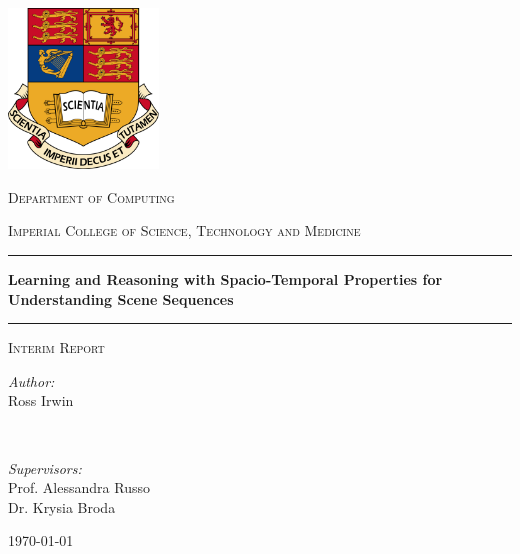 \begin{titlepage}

\newcommand{\HRule}{\rule{\linewidth}{0.5mm}} %

\begin{center}

\includegraphics[width = 4cm]{figures/imperial-crest}
\vspace{0.8cm}

\textsc{\large Department of Computing}
\vspace{0.3cm}

\textsc{\large Imperial College of Science, Technology and Medicine}
\vspace{0.8cm}

\HRule
\vspace{0.4cm}
\huge \textbf{Learning and Reasoning with Spacio-Temporal Properties for Understanding Scene Sequences} \\
\HRule
\vspace{0.5cm}

\textsc{\LARGE Interim Report}
\vspace{2cm}

\begin{minipage}[t]{0.4\textwidth}
\begin{flushleft}
  \large
  \emph{Author:} \\
  Ross Irwin
\end{flushleft}
\end{minipage}
~
\begin{minipage}[t]{0.4\textwidth}
\begin{flushright}
  \large
  \emph{Supervisors:} \\
  Prof. Alessandra Russo \\
  Dr. Krysia Broda
\end{flushright}
\end{minipage}

\vspace{3cm}

{\large \today} %

\vfill %

\end{center}

\end{titlepage}
